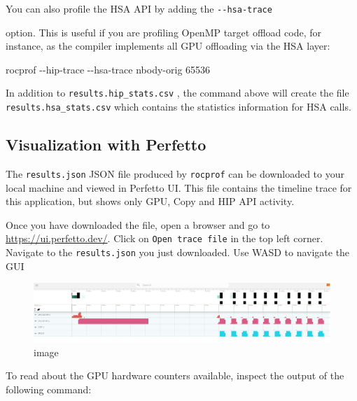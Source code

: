 \documentclass[
]{article}
\let\oldtexttt\texttt
\renewcommand{\texttt}[1]{
  \colorbox{Light}{\oldtexttt{#1}}
}
\newenvironment{Shaded}{}{}
\newcommand{\ExtensionTok}[1]{#1}
\newcommand{\FunctionTok}[1]{\textcolor[rgb]{0.02,0.16,0.49}{#1}}
\newcommand{\NormalTok}[1]{#1}
\newcommand{\VariableTok}[1]{\textcolor[rgb]{0.10,0.09,0.49}{#1}}
\begin{document}
You can also profile the HSA API by adding the \texttt{-\/-hsa-trace}
option. This is useful if you are profiling OpenMP target offload code,
for instance, as the compiler implements all GPU offloading via the HSA
layer:

\begin{Shaded}
\begin{Highlighting}[]
\ExtensionTok{rocprof}\NormalTok{ {-}{-}hip{-}trace {-}{-}hsa{-}trace nbody{-}orig 65536}
\end{Highlighting}
\end{Shaded}

In addition to\texttt{results.hip\_stats.csv}, the command above will
create the file \texttt{results.hsa\_stats.csv} which contains the
statistics information for HSA calls.

\hypertarget{visualization-with-perfetto}{%
\subsection{Visualization with
Perfetto}\label{visualization-with-perfetto}}

The \texttt{results.json} JSON file produced by \texttt{rocprof} can be
downloaded to your local machine and viewed in Perfetto UI. This file
contains the timeline trace for this application, but shows only GPU,
Copy and HIP API activity.

Once you have downloaded the file, open a browser and go to
\url{https://ui.perfetto.dev/}. Click on \texttt{Open\ trace\ file} in
the top left corner. Navigate to the \texttt{results.json} you just
downloaded. Use WASD to navigate the GUI

\begin{figure}
\centering
\includegraphics{rocprof/4548abe6eeb76b1896e88fbd38299521eef0d2cd.png}
\caption{image}
\end{figure}

To read about the GPU hardware counters available, inspect the output of
the following command:

\begin{Shaded}
\end{Shaded}
\end{document}
